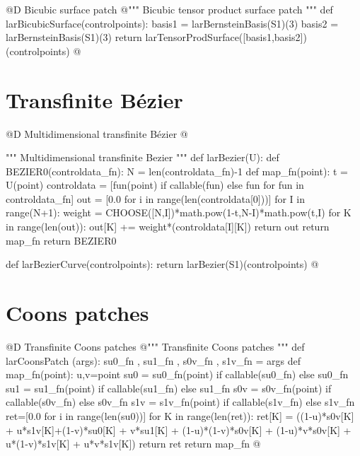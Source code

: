 \documentclass[11pt,oneside]{article}	%
\begin{document}
@D Bicubic surface patch
@{""" Bicubic tensor product surface patch """
def larBicubicSurface(controlpoints):
	basis1 = larBernsteinBasis(S1)(3)
	basis2 = larBernsteinBasis(S1)(3)
	return larTensorProdSurface([basis1,basis2])(controlpoints)
@}


\section{Transfinite B\'ezier}
@D Multidimensional transfinite B\'ezier
@{""" Multidimensional transfinite Bezier """
def larBezier(U):
	def BEZIER0(controldata_fn):
		N = len(controldata_fn)-1
		def map_fn(point):
			t = U(point)
			controldata = [fun(point) if callable(fun) else fun 
				for fun in controldata_fn]
			out = [0.0 for i in range(len(controldata[0]))]		
			for I in range(N+1):
				weight = CHOOSE([N,I])*math.pow(1-t,N-I)*math.pow(t,I)
				for K in range(len(out)):  out[K] += weight*(controldata[I][K])
			return out
		return map_fn
	return BEZIER0

def larBezierCurve(controlpoints):
	return larBezier(S1)(controlpoints)
@}

\section{Coons patches}

@D Transfinite Coons patches
@{""" Transfinite Coons patches """
def larCoonsPatch (args):
	su0_fn , su1_fn , s0v_fn , s1v_fn = args
	def map_fn(point):
		u,v=point
		su0 = su0_fn(point) if callable(su0_fn) else su0_fn
		su1 = su1_fn(point) if callable(su1_fn) else su1_fn
		s0v = s0v_fn(point) if callable(s0v_fn) else s0v_fn
		s1v = s1v_fn(point) if callable(s1v_fn) else s1v_fn
		ret=[0.0 for i in range(len(su0))]	
		for K in range(len(ret)):
			ret[K] = ((1-u)*s0v[K] + u*s1v[K]+(1-v)*su0[K] + v*su1[K] + 
			(1-u)*(1-v)*s0v[K] + (1-u)*v*s0v[K] + u*(1-v)*s1v[K] + u*v*s1v[K])
		return ret
	return map_fn
@}
\end{document}
